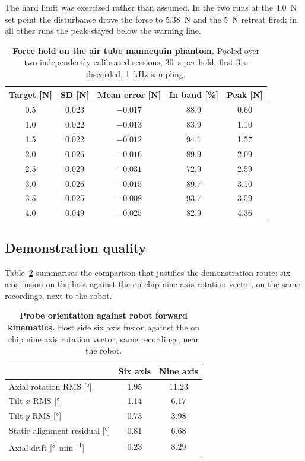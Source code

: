 \documentclass[conference]{IEEEtran}
\begin{document}
The hard limit was exercised rather than assumed. In the two runs at the
\SI{4.0}{\newton} set point the disturbance drove the force to
\SI{5.38}{\newton} and the \SI{5}{\newton} retreat fired; in all other runs the
peak stayed below the warning line.

\begin{table}[t]
\caption{\textbf{Force hold on the air tube mannequin phantom.} Pooled over
two independently calibrated sessions, \SI{30}{\second} per hold, first
\SI{3}{\second} discarded, \SI{1}{\kilo\hertz} sampling.}
\label{tab:force}
\centering
\begin{tabular}{ccccc}
\toprule
Target [N] & SD [N] & Mean error [N] & In band [\%] & Peak [N] \\
\midrule
0.5 & 0.023 & $-0.017$ & 88.9 & 0.60 \\
1.0 & 0.022 & $-0.013$ & 83.9 & 1.10 \\
1.5 & 0.022 & $-0.012$ & 94.1 & 1.57 \\
2.0 & 0.026 & $-0.016$ & 89.9 & 2.09 \\
2.5 & 0.029 & $-0.031$ & 72.9 & 2.59 \\
3.0 & 0.026 & $-0.015$ & 89.7 & 3.10 \\
3.5 & 0.025 & $-0.008$ & 93.7 & 3.59 \\
4.0 & 0.049 & $-0.025$ & 82.9 & 4.36 \\
\bottomrule
\end{tabular}
\end{table}

\subsection{Demonstration quality}

Table~\ref{tab:imu} summarises the comparison that justifies the demonstration
route: six axis fusion on the host against the on chip nine axis rotation
vector, on the same recordings, next to the robot.

\begin{table}[t]
\caption{\textbf{Probe orientation against robot forward kinematics.} Host side
six axis fusion against the on chip nine axis rotation vector, same recordings,
near the robot.}
\label{tab:imu}
\centering
\begin{tabular}{lcc}
\toprule
 & Six axis & Nine axis \\
\midrule
Axial rotation RMS [\si{\degree}]        & 1.95 & 11.23 \\
Tilt $x$ RMS [\si{\degree}]              & 1.14 & 6.17 \\
Tilt $y$ RMS [\si{\degree}]              & 0.73 & 3.98 \\
Static alignment residual [\si{\degree}] & 0.81 & 6.68 \\
Axial drift [\si{\degree\per\minute}]    & 0.23 & 8.29 \\
\bottomrule
\end{tabular}
\end{table}
\end{document}
